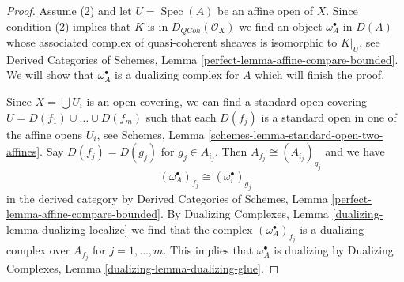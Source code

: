 \documentclass[10pt,a4paper]{amsart}
\theoremstyle{plain}
\theoremstyle{definition}
\theoremstyle{remark}
\numberwithin{equation}{subsection}
\def\Spec{\mathop{\mathrm{Spec}}}
\def\QCoh{\mathit{QCoh}}
\begin{document}
\begin{proof}
Assume (2) and let $U = \Spec(A)$ be an affine open of $X$.
Since condition (2) implies that $K$ is in $D_\QCoh(\mathcal{O}_X)$
we find an object $\omega_A^\bullet$ in $D(A)$ whose associated
complex of quasi-coherent sheaves is isomorphic to $K|_U$, see
Derived Categories of Schemes, Lemma
\ref{perfect-lemma-affine-compare-bounded}.
We will show that $\omega_A^\bullet$ is a dualizing complex for $A$
which will finish the proof.

\medskip\noindent
Since $X = \bigcup U_i$ is an open covering, we can find a standard
open covering $U = D(f_1) \cup \ldots \cup D(f_m)$ such that
each $D(f_j)$ is a standard open in one of the affine opens $U_i$, see
Schemes, Lemma \ref{schemes-lemma-standard-open-two-affines}.
Say $D(f_j) = D(g_j)$ for $g_j \in A_{i_j}$.
Then $A_{f_j} \cong (A_{i_j})_{g_j}$ and we have
$$
(\omega_A^\bullet)_{f_j} \cong (\omega_i^\bullet)_{g_j}
$$
in the derived category by
Derived Categories of Schemes, Lemma
\ref{perfect-lemma-affine-compare-bounded}.
By Dualizing Complexes, Lemma \ref{dualizing-lemma-dualizing-localize}
we find that
the complex $(\omega_A^\bullet)_{f_j}$ is a dualizing complex over
$A_{f_j}$ for $j = 1, \ldots, m$. This implies that $\omega_A^\bullet$
is dualizing by
Dualizing Complexes, Lemma \ref{dualizing-lemma-dualizing-glue}.
\end{proof}
\end{document}
